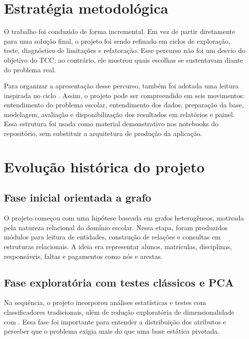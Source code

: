 \section{Estrat\'egia metodol\'ogica}
\label{sec:estrategia}

O trabalho foi conduzido de forma incremental. Em vez de partir diretamente para uma solu\c{c}\~ao final, o projeto foi sendo refinado em ciclos de explora\c{c}\~ao, teste, diagn\'ostico de limita\c{c}\~oes e refatora\c{c}\~ao. Esse percurso n\~ao foi um desvio do objetivo do TCC; ao contr\'ario, ele mostrou quais escolhas se sustentavam diante do problema real.

Para organizar a apresenta\c{c}\~ao desse percurso, tamb\'em foi adotada uma leitura inspirada no ciclo  \cite{wirth2000}. Assim, o projeto pode ser compreendido em seis movimentos: entendimento do problema escolar, entendimento dos dados, prepara\c{c}\~ao da base, modelagem, avalia\c{c}\~ao e disponibiliza\c{c}\~ao dos resultados em relat\'orios e painel. Essa estrutura foi usada como material demonstrativo nos notebooks do reposit\'orio, sem substituir a arquitetura de produ\c{c}\~ao da aplica\c{c}\~ao.

\section{Evolu\c{c}\~ao hist\'orica do projeto}
\label{sec:evolucao}

\subsection{Fase inicial orientada a grafo}

O projeto come\c{c}ou com uma hip\'otese baseada em grafos heterog\^eneos, motivada pela natureza relacional do dom\'inio escolar. Nessa etapa, foram produzidos m\'odulos para leitura de entidades, constru\c{c}\~ao de rela\c{c}\~oes e consultas em estruturas relacionais. A ideia era representar alunos, matr\'iculas, disciplinas, respons\'aveis, faltas e pagamentos como n\'os e arestas.

\subsection{Fase explorat\'oria com testes cl\'assicos e PCA}

Na sequ\^encia, o projeto incorporou an\'alises estat\'isticas e testes com classificadores tradicionais, al\'em de redu\c{c}\~ao explorat\'oria de dimensionalidade com . Essa fase foi importante para entender a distribui\c{c}\~ao dos atributos e perceber que o problema exigia mais do que uma base est\'atica pivotada.

